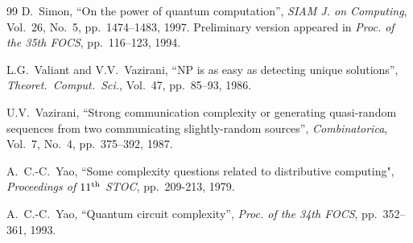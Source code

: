 \begin{thebibliography}{99}
D.~Simon, ``On the power of quantum computation'',
{\em SIAM J. on Computing}, Vol.~26, No.~5, pp.~1474--1483, 1997.
Preliminary version appeared in {\em Proc. of the 35th FOCS}, 
pp.~116--123, 1994.

L.G.~Valiant and V.V.~Vazirani, 
``NP is as easy as detecting unique solutions'', 
{\em Theoret.\ Comput.\ Sci.}, Vol.~47, pp.~85--93, 1986.

U.V.~Vazirani, 
``Strong communication complexity or generating quasi-random sequences from 
two communicating slightly-random sources'',
{\em Combinatorica}, Vol.~7, No.~4, pp.~375--392, 1987.

A.~C.-C.~Yao, 
``Some complexity questions related to distributive computing",
{\em Proceedings of $11^{\rm th}$ STOC}, pp.~209-213, 1979.

A.~C.-C.~Yao, 
``Quantum circuit complexity'', 
{\em Proc. of the 34th FOCS}, pp.~352--361, 1993.




\end{thebibliography}

